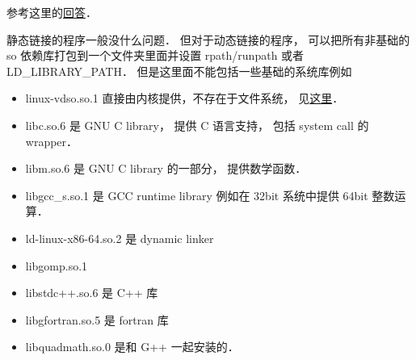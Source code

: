 
\begin{issues}
\issueDraft
\end{issues}


参考这里的\href{https://stackoverflow.com/questions/20183883/determining-binary-compatibility-under-linux}{回答}．

静态链接的程序一般没什么问题． 但对于动态链接的程序， 可以把所有非基础的 so 依赖库打包到一个文件夹里面并设置 rpath/runpath 或者 LD_LIBRARY_PATH． 但是这里面不能包括一些基础的系统库例如
\begin{itemize}
\item linux-vdso.so.1 直接由内核提供，不存在于文件系统， 见\href{https://unix.stackexchange.com/questions/476971/ldd-shows-no-location-after-arrow-library-does-not-exist-on-system}{这里}．
\item libc.so.6 是 GNU C library， 提供 C 语言支持， 包括 system call 的 wrapper．
\item libm.so.6 是 GNU C library 的一部分， 提供数学函数．
\item libgcc_s.so.1 是 GCC runtime library 例如在 32bit 系统中提供 64bit 整数运算．
\item ld-linux-x86-64.so.2 是 dynamic linker
\item libgomp.so.1
\item libstdc++.so.6 是 C++ 库
\item libgfortran.so.5 是 fortran 库
\item libquadmath.so.0 是和 G++ 一起安装的．
\end{itemize}

